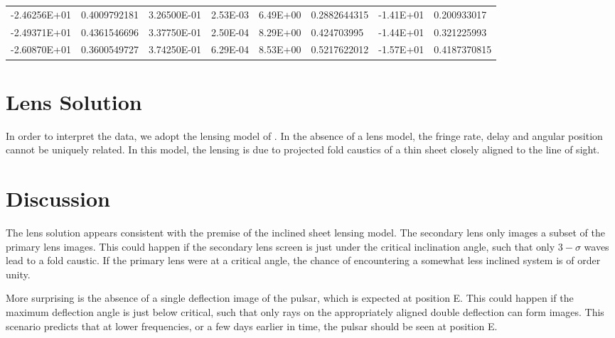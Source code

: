 \documentclass[useAMS,usenatbib]{mn2e}
\begin{document}
\begin{table}[h]
\begin{tabular}{llllllll}
-2.46256E+01 & 0.4009792181                                                     & 3.26500E-01 & 2.53E-03                                                        & 6.49E+00 & 0.2882644315                                                        & -1.41E+01 & 0.200933017                                                    \\
-2.49371E+01 & 0.4361546696                                                     & 3.37750E-01 & 2.50E-04                                                        & 8.29E+00 & 0.424703995                                                         & -1.44E+01 & 0.321225993                                                    \\
-2.60870E+01 & 0.3600549727                                                     & 3.74250E-01 & 6.29E-04                                                        & 8.53E+00 & 0.5217622012                                                        & -1.57E+01 & 0.4187370815                                                  
\end{tabular}
\end{table}

\section{Lens Solution}

In order to interpret the data, we adopt the lensing model of
\citet{2014MNRAS.442.3338P}.  In the absence of a lens model, the
fringe rate, delay and angular position cannot be uniquely related. In
this model, the lensing is due to projected fold caustics of a thin
sheet closely aligned to the line of sight.

\section{Discussion}

The lens solution appears consistent with the premise of the inclined
sheet lensing model\citep{2014MNRAS.442.3338P}.  The secondary lens
only images a subset of the primary lens images.  This could happen if
the secondary lens screen is just under the critical inclination
angle, such that only $3-\sigma$ waves lead to a fold caustic.  If the
primary lens were at a critical angle, the chance of encountering a
somewhat less inclined system is of order unity.

More surprising is the absence of a single deflection image of the
pulsar, which is expected at position E.  This could happen if the
maximum deflection angle is just below critical, such that only rays
on the appropriately aligned double deflection can form images.  This
scenario predicts that at lower frequencies, or a few days earlier in
time, the pulsar should be seen at position E.
\end{document}
